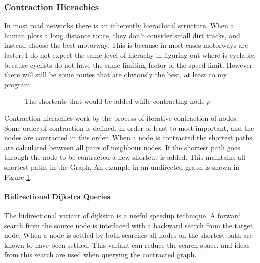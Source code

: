 \documentclass[11pt,twoside,a4paper]{report}
\begin{document}
\subsubsection{Contraction Hierachies}
In most road networks there is an inherently hierachical structure. When a human plots a long distance route, they don't consider small dirt tracks, and instead choose the best motorway. 
This is because in most cases motorways are faster. I do not expect the same level of hierachy in figuring out where is cyclable, because cyclists do not have the same limiting factor of the speed limit. However there will still be 
some routes that are obviously the best, at least to my program.\\
\begin{figure}
    \begin{center}
\end{center}
    \caption{The shortcuts that would be added while contracting node $p$}
    \label{Contraction}
\end{figure}
Contraction hierachies work by the process of iterative contraction of nodes. Some order of contraction is defined, in order of least to most important, and the nodes are contracted in this order.
When a node is contracted the shortest paths are calculated between all pairs of neighbour nodes. If the shortest path goes through the node to be contracted a new shortcut is added. This maintains all shortest paths in the Graph. 
An example in an undirected graph is shown in Figure \ref{Contraction}. 
\paragraph{Bidirectional Dijkstra Queries}
The bidirectional variant of dijkstra is a useful speedup technique. A forward search from the source node is interlaced with a backward search from the target node. When a node is settled by both searches all nodes on the shortest path are known to have been settled.
This variant can reduce the search space, and ideas from this search are used when querying the contracted graph.
\end{document}
